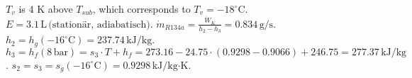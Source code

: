 \( T_v \) is 4 K above \( T_{sub} \), which corresponds to \( T_v = -18^\circ \text{C} \).  
\( E = 3.1 \, \text{L} \, \text{(stationär, adiabatisch)} \).  
\( \dot{m}_{R134a} = \frac{\dot{W}_K}{h_2 - h_3} = 0.834 \, \text{g/s} \).  
\( h_2 = h_g(-16^\circ \text{C}) = 237.74 \, \text{kJ/kg} \).  
\( h_3 = h_f(8 \, \text{bar}) = s_3 \cdot T + h_f = 273.16 - 24.75 \cdot (0.9298 - 0.9066) + 246.75 = 277.37 \, \text{kJ/kg} \).  
\( s_2 = s_3 = s_g(-16^\circ \text{C}) = 0.9298 \, \text{kJ/kg·K} \).